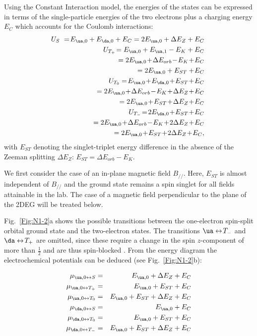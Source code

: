 \documentclass[12pt,aps,nofootinbib]{revtex4-1}
\begin{document}
Using the Constant Interaction model, the energies of the states can be expressed in
terms of the single-particle energies of the two electrons plus a
charging energy $E_{C}$ which accounts for the Coulomb
interactions:
\begin{eqnarray*}
    &&\!\!\!\!\!\!\!\!U_S\ =\! E_{\ua,0}+ E_{\da,0} + E_{C} = 2 E_{\ua,0}+ \Delta E_{Z} + E_{C}\\
    &&\!\!\!\!\!\!\!\!U_{T_+}\!= E_{\ua,0}+ E_{\ua,1} - E_{K} + E_{C} \\
    && = 2 E_{\ua,0}\!+\! \Delta E_{orb}\! -\! E_{K}\! +\! E_{C} \\
    && = 2 E_{\ua,0} + E_{ST} + \!E_{C}\\
    &&\!\!\!\!\!\!\!\!U_{T_0} =\! E_{\ua,0}\! + \! E_{\da,0}\! + \! E_{ST}\!+\!E_{C}\\
    &&=2 E_{\ua,0}\!+\! \Delta E_{orb}\! -\! E_{K}\! +\! \Delta E_{Z}\! +\! E_{C} \\
    && =2 E_{\ua,0}\!+\! E_{ST}\! +\! \Delta E_{Z}\! + \! E_{C}\\
    &&\!\!\!\!\!\!\!\!U_{T_-}\! =\! 2E_{\da,0}\!+\!E_{ST}\!+\!E_{C}\\
    &&=2 E_{\ua,0}\!+\! \Delta E_{orb}\! -\! E_{K}\! +\! 2 \Delta E_{Z}\! +\! E_{C} \\
    &&=2 E_{\ua,0}\!+\!E_{ST}\!+\! 2 \Delta E_{Z} \!+\!E_{C},
\end{eqnarray*}
with $E_{ST}$ denoting the singlet-triplet energy difference in the absence of the Zeeman splitting $\Delta E_{Z}$: $E_{ST}=\Delta E_{orb}-E_{K}$.

We first consider the case of an in-plane magnetic field $B_{//}$.
Here, $E_{ST}$ is almost independent of $B_{//}$ and the ground
state remains a spin singlet for all fields attainable in the lab.
The case of a magnetic field perpendicular to the plane of the
2DEG will be treated below.

Fig.~\ref{Fig:N1-2}a shows the possible transitions between the
one-electron spin-split orbital ground state and the two-electron
states. The transitions $\ua\leftrightarrow\!T_-$ and
$\da\leftrightarrow\!T_+$ are omitted, since these require a
change in the spin $z$-component of more than $\frac{1}{2}$ and
are thus spin-blocked \cite{Weinmann}. From the energy diagram the
electrochemical potentials can be deduced (see
Fig.~\ref{Fig:N1-2}b):

\begin{eqnarray*}
    \mu_{\ua,0\leftrightarrow S} &=& E_{\ua,0} + \Delta E_{Z} + E_{C}\\
    \mu_{\ua,0\leftrightarrow T_+} &=& E_{\ua,0}+ E_{ST} + E_{C}\\
    \mu_{\ua,0\leftrightarrow T_0} &=& E_{\ua,0}+ E_{ST} + \Delta E_Z + E_{C}\\
    \mu_{\da,0\leftrightarrow S} &=& E_{\ua,0} + E_{C}\\
    \mu_{\da,0\leftrightarrow T_0} &=& E_{\ua,0}+ E_{ST} + E_{C}\\
    \mu_{\da,0\leftrightarrow T_-} &=& E_{\ua,0}+ E_{ST} + \Delta E_Z + E_{C}
\end{eqnarray*}
\end{document}
